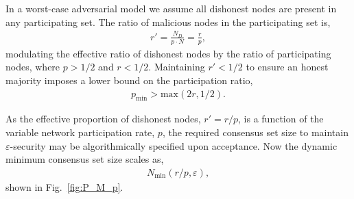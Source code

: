 In a worst-case adversarial model we assume all dishonest nodes are present in any participating set. The ratio of malicious nodes in the participating set is,
\begin{align}
	r' = \frac{N_D}{p\cdot N} = \frac{r}{p},
\end{align}
modulating the effective ratio of dishonest nodes by the ratio of participating nodes, where \mbox{$p>1/2$} and \mbox{$r<1/2$}. Maintaining \mbox{$r'<1/2$} to ensure an honest majority imposes a lower bound on the participation ratio,
\begin{align}
	p_\mathrm{min} > \mathrm{max}(2r,1/2).
\end{align}

As the effective proportion of dishonest nodes, \mbox{$r'=r/p$}, is a function of the variable network participation rate, $p$, the required consensus set size to maintain $\varepsilon$-security may be algorithmically specified upon acceptance. Now the dynamic minimum consensus set size scales as,
\begin{align}
	N_\mathrm{min}(r/p,\varepsilon),
\end{align}
shown in Fig.~\ref{fig:P_M_p}.

